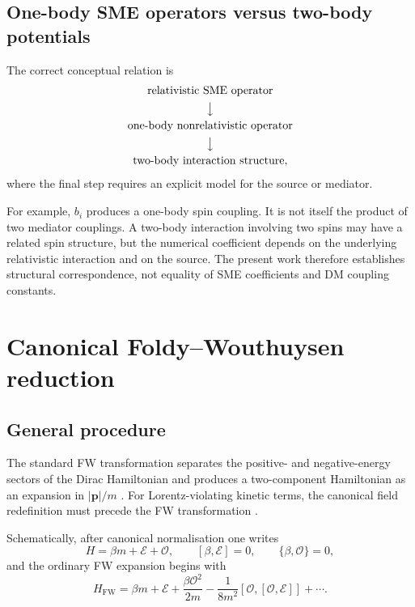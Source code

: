 \documentclass[aps,prd,reprint,superscriptaddress,nofootinbib]{revtex4-2}
\newcommand{\FW}{\mathrm{FW}}
\begin{document}
	\subsection{One-body SME operators versus two-body potentials}
	
	The correct conceptual relation is
	\begin{equation}
		\begin{gathered}
			\text{relativistic SME operator}\\
			\big\downarrow\\
			\text{one-body nonrelativistic operator}\\
			\big\downarrow\\
			\text{two-body interaction structure},
		\end{gathered}
		\label{eq:matchingchain}
	\end{equation}
	where the final step requires an explicit model for the source or
	mediator.
	
	For example, $b_i$ produces a one-body spin coupling. It is not itself
	the product of two mediator couplings. A two-body interaction involving
	two spins may have a related spin structure, but the numerical
	coefficient depends on the underlying relativistic interaction and on
	the source. The present work therefore establishes structural
	correspondence, not equality of SME coefficients and DM coupling
	constants.
	
	\section{Canonical Foldy--Wouthuysen reduction}
	
	\subsection{General procedure}
	
	The standard FW transformation separates the positive- and
	negative-energy sectors of the Dirac Hamiltonian and produces a
	two-component Hamiltonian as an expansion in $|\mathbf p|/m$
	\cite{FoldyWouthuysen1950}. For Lorentz-violating kinetic terms, the
	canonical field redefinition must precede the FW transformation
	\cite{KosteleckyLane1999}.
	
	Schematically, after canonical normalisation one writes
	\begin{equation}
		H=\beta m+\mathcal E+\mathcal O,
		\qquad
		[\beta,\mathcal E]=0,
		\qquad
		\{\beta,\mathcal O\}=0,
	\end{equation}
	and the ordinary FW expansion begins with
	\begin{equation}
		H_{\FW}
		=
		\beta m+\mathcal E
		+\frac{\beta\mathcal O^2}{2m}
		-\frac{1}{8m^2}
		[\mathcal O,[\mathcal O,\mathcal E]]
		+\cdots .
		\label{eq:FW}
	\end{equation}
	
\end{document}
